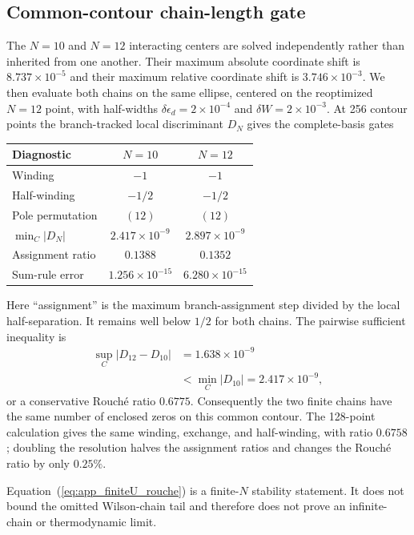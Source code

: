\documentclass[%
  aps,prb,reprint,amsmath,amssymb,superscriptaddress,longbibliography,floatfix
]{revtex4-2}
\begin{document}
\subsection{Common-contour chain-length gate}

The $N=10$ and $N=12$ interacting centers are solved independently rather
than inherited from one another.  Their maximum absolute coordinate shift is
$8.737\times10^{-5}$ and their maximum relative coordinate shift is
$3.746\times10^{-3}$.  We then evaluate both chains on the same ellipse,
centered on the reoptimized $N=12$ point, with half-widths
$\delta\epsilon_d=2\times10^{-4}$ and $\delta W=2\times10^{-3}$.
At 256 contour points the branch-tracked local discriminant $D_N$ gives the
complete-basis gates
\begin{center}
\begin{tabular}{@{}lcc@{}}
\toprule
Diagnostic & $N=10$ & $N=12$\\
\midrule
Winding & $-1$ & $-1$\\
Half-winding & $-1/2$ & $-1/2$\\
Pole permutation & $(12)$ & $(12)$\\
$\min_C|D_N|$ & $2.417\times10^{-9}$ & $2.897\times10^{-9}$\\
Assignment ratio & $0.1388$ & $0.1352$\\
Sum-rule error & $1.256\times10^{-15}$ & $6.280\times10^{-15}$\\
\bottomrule
\end{tabular}
\end{center}
Here ``assignment'' is the maximum branch-assignment step divided by the
local half-separation.  It remains well below $1/2$ for both chains.  The
pairwise sufficient inequality is
\begin{equation}
\begin{aligned}
\sup_C|D_{12}-D_{10}|&=1.638\times10^{-9}\\
&<\min_C|D_{10}|=2.417\times10^{-9},
\end{aligned}
\label{eq:app_finiteU_rouche}
\end{equation}
or a conservative Rouch\'e ratio $0.6775$.  Consequently the two finite
chains have the same number of enclosed zeros on this common contour.  The
128-point calculation gives the same winding, exchange, and half-winding,
with ratio $0.6758$; doubling the resolution halves the assignment ratios
and changes the Rouch\'e ratio by only $0.25\%$.

Equation~(\ref{eq:app_finiteU_rouche}) is a finite-$N$ stability statement.
It does not bound the omitted Wilson-chain tail and therefore does not prove
an infinite-chain or thermodynamic limit.
\end{document}
